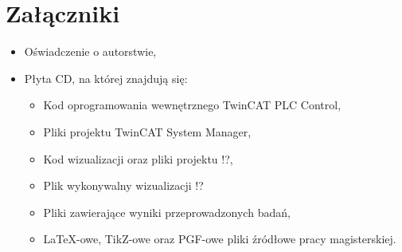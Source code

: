 \section{Załączniki}
\begin{itemize}
\item Oświadczenie o autorstwie,
\item Płyta CD, na której znajdują się:
\begin{itemize}
\item Kod oprogramowania wewnętrznego TwinCAT PLC Control,
\item Pliki projektu TwinCAT System Manager,
\item Kod wizualizacji oraz pliki projektu !?,
\item Plik wykonywalny wizualizacji !?
\item Pliki zawierające wyniki przeprowadzonych badań,
\item \LaTeX-owe, TikZ-owe oraz PGF-owe  pliki źródłowe pracy magisterskiej.
\end{itemize}
\end{itemize}
